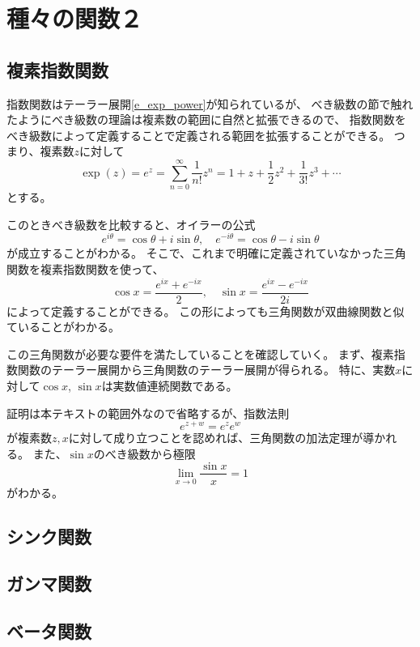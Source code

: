 
\chapter{種々の関数２}

\section{複素指数関数}

指数関数はテーラー展開\eqref{e_exp_power}が知られているが、
べき級数の節で触れたようにべき級数の理論は複素数の範囲に自然と拡張できるので、
指数関数をべき級数によって定義することで定義される範囲を拡張することができる。
つまり、複素数$z$に対して
$$
\exp(z) = e^z = \sum_{n = 0}^\infty \frac{1}{n!}z^n = 1+z+\frac{1}{2}z^2+\frac{1}{3!}z^3+\cdots
$$
とする。

このときべき級数を比較すると、オイラーの公式
$$
e^{i\theta} = \cos\theta+i\sin\theta,
\quad e^{-i\theta} = \cos\theta-i\sin\theta
$$
が成立することがわかる。
そこで、これまで明確に定義されていなかった三角関数を複素指数関数を使って、
$$
\cos x = \frac{e^{i x}+e^{-i x}}{2},
\quad \sin x = \frac{e^{i x}-e^{-i x}}{2 i}
$$
によって定義することができる。
この形によっても三角関数が双曲線関数と似ていることがわかる。

この三角関数が必要な要件を満たしていることを確認していく。
まず、複素指数関数のテーラー展開から三角関数のテーラー展開が得られる。
特に、実数$x$に対して$\cos x$, $\sin x$は実数値連続関数である。

証明は本テキストの範囲外なので省略するが、指数法則
$$
e^{z+w} = e^z e^w
$$
が複素数$z, x$に対して成り立つことを認めれば、三角関数の加法定理が導かれる。
また、$\sin x$のべき級数から極限
$$
\lim_{x \to 0}\frac{\sin x}{x} = 1
$$
がわかる。

\section{シンク関数}

\section{ガンマ関数}

\section{ベータ関数}
